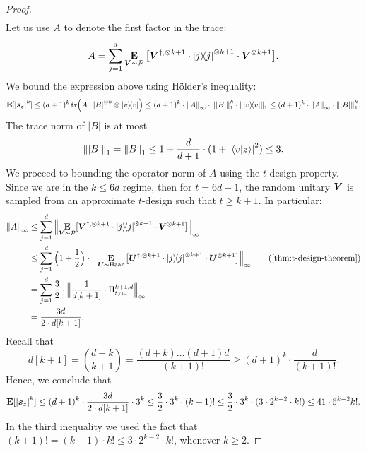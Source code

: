\documentclass{article}
\begin{document}
\begin{proof}
\begin{align*}
    \end{align*}
    Let us use $A$ to denote the first factor in the trace:
    \begin{equation*}
        A = \sum_{j=1}^d \mathop{\bf E\/}_{\boldsymbol{V} \sim \mathcal{P}} \big[\boldsymbol{V}^{\dagger, \otimes k+1} \cdot \ketbra{j}^{\otimes k+1} \cdot \boldsymbol{V}^{\otimes k+1}\big].
    \end{equation*}
    We bound the expression above using H\"older's inequality:
    \begin{equation*}
        \mathop{\bf E\/}[\abs{\boldsymbol{s}_z}^k] \leq (d+1)^k \tr(A \cdot \abs{B}^{\otimes k} \otimes \ketbra{v}) \leq (d+1)^k \cdot \norm{A}_{\infty} \cdot \norm{\abs{B}}_1^k \cdot \norm{\ketbra{v}}_1 \leq (d+1)^k \cdot \norm{A}_{\infty} \cdot \norm{\abs{B}}_1^k.
    \end{equation*}
    The trace norm of $|B|$ is at most
    \begin{equation*}
        \norm{|B|}_1 = \norm{B}_1 \leq 1 + \frac{d}{d+1}\cdot (1 + \abs{\braket{v}{z}}^2) \leq 3.
    \end{equation*}
    We proceed to bounding the operator norm of $A$ using the $t$-design property.
    Since we are in the $k \leq 6d$ regime, then for $t = 6d+1$, the random unitary $\boldsymbol{V}$ is sampled from an approximate $t$-design such that $t \geq k+1$. In particular:
    \begin{align*}
        \norm{A}_{\infty}
        &\leq \sum_{j=1}^d  \norm{\E_{\bV \sim \mathcal{P}} [\bV^{\dagger, \otimes k+1} \cdot \ketbra{j}^{\otimes k+1} \cdot \bV^{\otimes k+1}]}_{\infty} \\
        &\leq \sum_{j=1}^d \Big(1 + \frac{1}{2}\Big) \cdot\Big \lVert\E_{\bU \sim \mathrm{Haar}} \big[ \bU^{\dagger, \otimes k+1} \cdot \ketbra{j}^{\otimes k+1} \cdot \bU^{\otimes k+1} \big] \Big \rVert_{\infty} \tag{\Cref{thm:t-design-theorem}} \\
        &= \sum_{j=1}^d \frac{3}{2}\cdot \Big \lVert \frac{1}{d[k+1]} \cdot \Pi_{\mathrm{sym}}^{k+1, d} \Big \rVert_{\infty} \\
        &= \frac{3d}{2\cdot d[k+1]}.
    \end{align*}
    Recall that
    \begin{equation*}
        d[k+1] = \binom{d+k}{k+1} = \frac{(d+k) \dots (d+1)d}{(k+1)!} \geq (d+1)^k \cdot \frac{d}{(k+1)!}.
    \end{equation*}
    Hence, we conclude that
    \begin{equation*}
        \mathop{\bf E\/}[\abs{\boldsymbol{s}_z}^k] \leq (d+1)^k \cdot \frac{3d}{2\cdot d[k+1]} \cdot 3^k \leq 
        \frac{3}{2} \cdot 3^k \cdot (k+1)! \leq \frac{3}{2} \cdot 3^k \cdot (3\cdot 2^{k-2} \cdot k!)
        \leq 41 \cdot 6^{k-2} k!.
    \end{equation*}
    In the third inequality we used the fact that $(k+1)! = (k+1) \cdot k! \leq 3\cdot 2^{k-2} \cdot k!$, whenever $k \geq 2$.
\end{proof}
\end{document}
